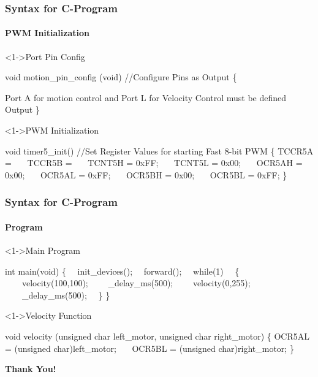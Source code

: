 \documentclass[table,10pt,red]{beamer}	%
\begin{document}
\begin{frame}[shrink = 4,fragile]
\frametitle{Syntax for C-Program} \pause
\framesubtitle{PWM Initialization}
\begin{block}<1->{Port Pin Config}	\pause
\begin{semiverbatim}
\scriptsize{
void motion_pin_config (void) \color{green} //Configure Pins as Output\color{black}
\{

Port A for motion control and Port L for Velocity Control must be defined Output
\} }
\end{semiverbatim}
\end{block} \pause
\begin{block}<1->{PWM Initialization}	\pause
\begin{semiverbatim}
\scriptsize{
void timer5_init()	\color{green} //Set Register Values for starting Fast 8-bit PWM  \color{black}
\{
TCCR5A =  
\ \ \	TCCR5B =
\ \ \	TCNT5H = 0xFF; 
\ \ \	TCNT5L = 0x00; 
\ \ \	OCR5AH = 0x00;
\ \ \ OCR5AL = 0xFF;
\ \ \	OCR5BH = 0x00;
\ \ \ OCR5BL = 0xFF;
\} }
\end{semiverbatim}
\end{block} 
\end{frame}
\begin{frame}[shrink = 2,fragile]
\frametitle{Syntax for C-Program} \pause
\framesubtitle{Program}
\begin{block}<1->{Main Program}	\pause
\begin{semiverbatim}
\scriptsize{
int main(void)
\{
\ \		init_devices(); 
\ \		forward();
\ \		while(1)
\ \		\{
\ \ \ \			velocity(100,100);
\ \ \ \			_delay_ms(500);
\ \ \ \			velocity(0,255);
\ \ \ \			_delay_ms(500);
\ \		\}
\}
}
\end{semiverbatim}
\end{block} \pause
\begin{block}<1->{Velocity Function}	\pause
\begin{semiverbatim}
\scriptsize{
void velocity (unsigned char left_motor, unsigned char right_motor)	
\{
OCR5AL = (unsigned char)left_motor;
\ \ \	OCR5BL = (unsigned char)right_motor;
\}} 
\end{semiverbatim}
\end{block} 
\end{frame}
\begin{frame}
	\centering	
	\hskip4cm
	\textbf{\LARGE Thank You!} \\[20pt]
	\hskip3cm
\end{frame}
\end{document}
